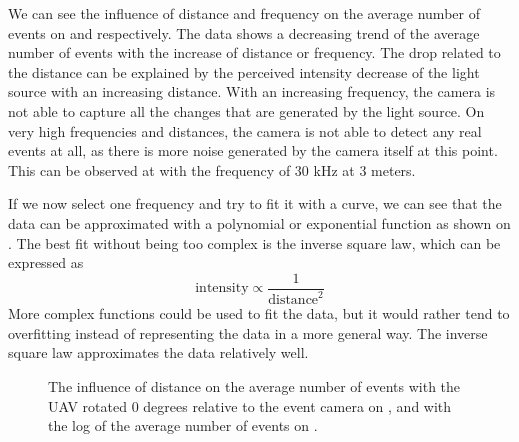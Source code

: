 We can see the influence of distance and frequency on the average number of events on
 and  respectively. The data shows a decreasing trend of the average number of events
with the increase of distance or frequency. The drop related to the distance can be explained by the perceived intensity
decrease of the light source with an increasing distance. With an increasing frequency, the camera is not able to capture
all the changes that are generated by the light source. On very high frequencies and distances, the camera is not able
to detect any real events at all, as there is more noise generated by the camera itself at this point. This can be observed
at  with the frequency of $30$ kHz at $3$ meters.

If we now select one frequency and try to fit it with a curve,
we can see that the data can be approximated with a polynomial or exponential function as shown on .
The best fit without being too complex is the inverse square law, which can be expressed as
\begin{equation}
	\text{intensity} \propto \frac{1}{\text{distance}^2}
\end{equation}
More complex functions could be used to fit the data, but it would rather tend to overfitting instead
of representing the data in a more general way. The inverse square law approximates the data relatively well.

\begin{figure}[htbp]
	\centering
	\caption{
  The influence of distance on the average number of events with the UAV rotated 0 degrees relative to the event camera on , and with the log of the average number of events on .
  }
	\label{fig:dist}
\end{figure}

